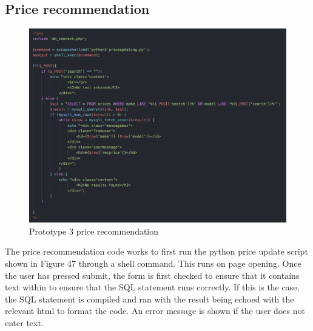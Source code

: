 \subsection{Price recommendation}
 \begin{figure}[H]
    \centering
    \includegraphics[scale=0.5]{ch3_developing/proto3/recprice.png}
    \caption{Prototype 3 price recommendation}
    \label{fig:proto3_price}
\end{figure}
The price recommendation code works to first run the python price update script shown in Figure 47 through a shell command. This runs on page opening. Once the user has pressed submit, the form is first checked to ensure that it contains text within to ensure that the SQL statement runs correctly. If this is the case, the SQL statement is compiled and ran with the result being echoed with the relevant html to format the code. An error message is shown if the user does not enter text.
